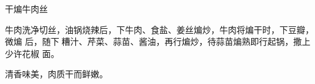 \begin{recipe}{干煸牛肉丝}

\ingredients


\preparation

牛肉洗净切丝，油锅烧辣后，下牛肉、食盐、姜丝煸炒，牛肉将煸干时，下豆瓣，微煸
后，随下𰪿糟汁、芹菜、蒜苗、酱油，再行煸炒，待蒜苗煸熟即行起锅，撒上少许花椒
面。

\features

清香味美，肉质干而鲜嫩。

\end{recipe}

